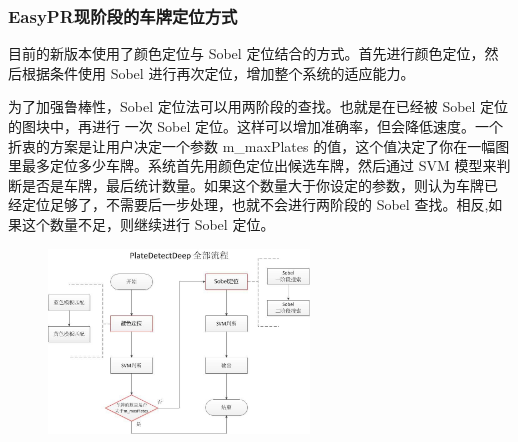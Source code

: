 \subsubsection{EasyPR现阶段的车牌定位方式}
目前的新版本使用了颜色定位与 Sobel 定位结合的方式。首先进行颜色定位，然后根据条件使用 Sobel 进行再次定位，增加整个系统的适应能力。 

为了加强鲁棒性，Sobel 定位法可以用两阶段的查找。也就是在已经被 Sobel 定位的图块中，再进行 一次 Sobel 定位。这样可以增加准确率，但会降低速度。一个折衷的方案是让用户决定一个参数 m\_maxPlates 的值，这个值决定了你在一幅图里最多定位多少车牌。系统首先用颜色定位出候选车牌，然后通过 SVM 模型来判断是否是车牌，最后统计数量。如果这个数量大于你设定的参数，则认为车牌已 经定位足够了，不需要后一步处理，也就不会进行两阶段的 Sobel 查找。相反,如果这个数量不足，则继续进行 Sobel 定位。 
\begin{figure}[H]
    \centering 
    \includegraphics[width=0.618\textwidth]{image/2_6_3_1.jpg}    
    \label{logic}
\end{figure}
